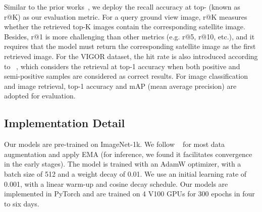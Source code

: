 \documentclass[sn-basic,iicol]{sn-jnl}
\theoremstyle{thmstyletwo}\newtheorem{example}{Example}\newtheorem{remark}{Remark}
\theoremstyle{thmstylethree}\newtheorem{definition}{Definition}
\begin{document}
Similar to the prior works~\citep{CVUSA,hu2018cvm,SAFA2019}, we deploy the recall accuracy at top- (known as r@K) as our evaluation metric. For a query ground view image, r@K measures whether the retrieved top-K images contain the corresponding satellite image. Besides, r@1 is more challenging than other metrics (e.g. r@5, r@10, etc.), and it requires that the model must return the corresponding satellite image as the first retrieved image. For the VIGOR dataset, the hit rate is also introduced according to ~\citep{VIGOR2021}, which considers the retrieval at top-1 accuracy when both positive and semi-positive samples are considered as correct results. For image classification and image retrieval, top-1 accuracy and mAP (mean average precision) are adopted for evaluation.









\subsection{Implementation Detail}








 Our models are pre-trained on ImageNet-1k. We follow ~\citep{DeiT} for most data augmentation and apply EMA (for inference, we found it facilitates convergence in the early stages). The model is trained with an AdamW optimizer, with a batch size of 512 and a weight decay of 0.01. We use an initial learning rate of 0.001, with a linear warm-up and cosine decay schedule. Our models are implemented in PyTorch and are trained on 4 V100 GPUs for 300 epochs in four to six days.
\end{document}
